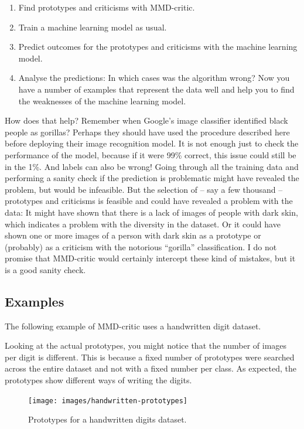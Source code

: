 \documentclass[
  10pt,
]{scrbook}
\providecommand{\tightlist}{%
  \setlength{\itemsep}{0pt}\setlength{\parskip}{0pt}}
\begin{document}
\begin{enumerate}
\def\labelenumi{\arabic{enumi}.}
\tightlist
\item
  Find prototypes and criticisms with MMD-critic.
\item
  Train a machine learning model as usual.
\item
  Predict outcomes for the prototypes and criticisms with the machine learning model.
\item
  Analyse the predictions: In which cases was the algorithm wrong?
  Now you have a number of examples that represent the data well and help you to find the weaknesses of the machine learning model.
\end{enumerate}

How does that help?
Remember when Google's image classifier identified black people as gorillas?
Perhaps they should have used the procedure described here before deploying their image recognition model.
It is not enough just to check the performance of the model, because if it were 99\% correct, this issue could still be in the 1\%.
And labels can also be wrong!
Going through all the training data and performing a sanity check if the prediction is problematic might have revealed the problem, but would be infeasible.
But the selection of -- say a few thousand -- prototypes and criticisms is feasible and could have revealed a problem with the data:
It might have shown that there is a lack of images of people with dark skin, which indicates a problem with the diversity in the dataset.
Or it could have shown one or more images of a person with dark skin as a prototype or (probably) as a criticism with the notorious ``gorilla'' classification.
I do not promise that MMD-critic would certainly intercept these kind of mistakes, but it is a good sanity check.

\hypertarget{examples-3}{%
\subsection{Examples}\label{examples-3}}

The following example of MMD-critic uses a handwritten digit dataset.

Looking at the actual prototypes, you might notice that the number of images per digit is different.
This is because a fixed number of prototypes were searched across the entire dataset and not with a fixed number per class.
As expected, the prototypes show different ways of writing the digits.

\begin{figure}

{\centering \texttt{[image: images/handwritten-prototypes]} 

}

\caption{Prototypes for a handwritten digits dataset.}\label{fig:prototypes-and-criticisms2}
\end{figure}
\end{document}
